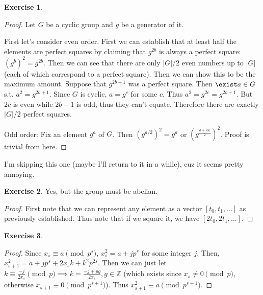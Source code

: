 \documentclass[11pt]{article}
\theoremstyle{definition}
\newtheorem{exercise}{{Exercise}}
\newcommand{\Z}{\mathbb{Z}}
\begin{document}
\begin{exercise}
	\begin{proof}
		Let $G$ be a cyclic group and $g$ be a generator of it.

		First let's consider even order. First we can establish that at least half the elements are perfect squares by claiming that $g^{2b}$ is always a perfect square: $(g^b)^2 = g^{2b}$. Then we can see that there are only $|G|/2$ even numbers up to $|G|$ (each of which correspond to a perfect square). Then we can show this to be the maximum amount. Suppose that $g^{2b+1}$ was a perfect square. Then $\exist a \in G$ s.t. $a^2 = g^{2b+1}$. Since $G$ is cyclic, $a = g^c$ for some $c$. Thus $a^2 = g^{2c} = g^{2b+1}$. But $2c$ is even while $2b+1$ is odd, thus they can't equate. Therefore there are exactly $|G|/2$ perfect squares.

		Odd order: Fix an element $g^a$ of $G$. Then $(g^{a/2})^2 = g^a$ or $\left(g^{\frac{a+|G|}{2}}\right)^2$. Proof is trivial from here.
	\end{proof}
\end{exercise}

I'm skipping this one (maybe I'll return to it in a while), cuz it seems pretty annoying.
\begin{exercise}
	Yes, but the group must be abelian.
\begin{proof}
	First note that we can represent any element as a vector $[t_0, t_1, \ldots]$ as previously established. Thus note that if we square it, we have $[2t_0, 2t_1, \ldots]$.
\end{proof}
\end{exercise}

\begin{exercise}
\begin{proof}
	Since $x_s \equiv a \pmod{p^s}$, $x_s^2 = a + jp^s$ for some integer $j$. Then, $x_{s+1}^2 = a + jp^s + 2x_sk + k^2p^{2s}$. Then we can just let $k \equiv \frac{-j}{2x_s} \pmod{p} \implies k = \frac{-j + pg}{2x_s}, g\in\Z$ (which exists since $x_s \ne 0 \pmod{p}$, otherwise $x_{s+1} \equiv 0 \pmod{p^{s+1}}$). Thus $x_{s+1}^2 \equiv a \pmod{p^{s+1}}$. 
\end{proof}
\end{exercise}
\end{document}

